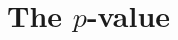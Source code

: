 \documentclass[]{book}\usepackage[]{graphicx}\usepackage[]{color}
\begin{document}
%
%
%
%
%
%
%
%
%
%
%
%
%

\section{The $p$-value}
\end{document}
